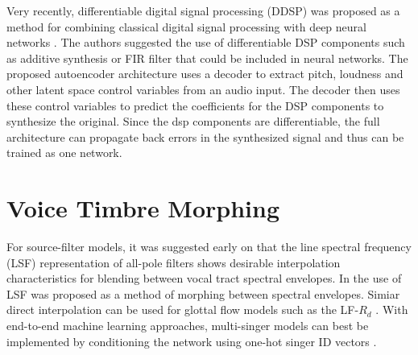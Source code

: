 Very recently, differentiable digital signal processing (DDSP) was proposed as a method for combining classical digital signal processing with deep neural networks \cite{engel_ddsp:_2020}. The authors suggested the use of differentiable DSP components such as additive synthesis or FIR filter that could be included in neural networks. The proposed autoencoder architecture uses a decoder to extract pitch, loudness and other latent space control variables from an audio input. The decoder then uses these control variables to predict the coefficients for the DSP components to synthesize the original. Since the dsp components are differentiable, the full architecture can propagate back errors in the synthesized signal and thus can be trained as one network. 


\section{Voice Timbre Morphing}

For source-filter models, it was suggested early on that the line spectral frequency (LSF)\cite{itakura_line_1975} representation of all-pole filters shows desirable interpolation characteristics for blending between vocal tract spectral envelopes. In \cite{roddy_method_2014} the use of LSF was proposed as a method of morphing between spectral envelopes. Simiar direct interpolation can be used for glottal flow models such as the LF-$R_d$ \cite{fant_lf-model_1995}. With end-to-end machine learning approaches, multi-singer models can best be implemented by conditioning the network using  one-hot singer ID vectors \cite{oord_wavenet:_2016}.